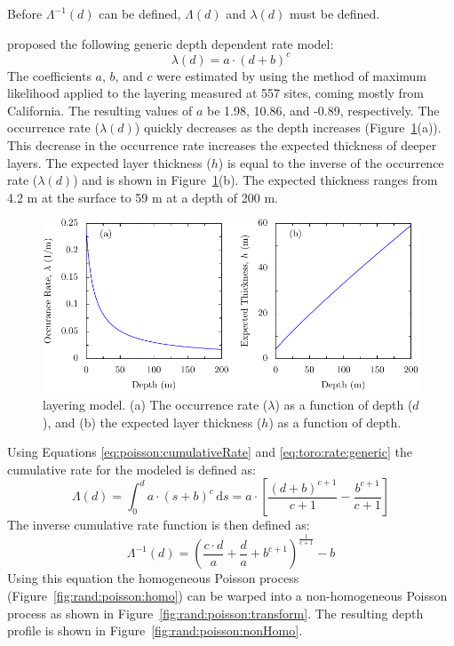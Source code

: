 \documentclass[11pt]{report}
\newcommand{\ud}{\,\mathrm{d}}
\begin{document}
Before $\Lambda^{-1}(d)$ can be
defined, $\Lambda(d)$ and $\lambda(d)$ must be defined.

\citet{toro:95} proposed the following generic depth dependent rate model:
\begin{equation}
  \lambda(d)= a \cdot (d + b)^{c}
  \label{eq:toro:rate:generic}
\end{equation}
The coefficients $a$, $b$, and $c$ were estimated by \citet{toro:95} using the method of maximum
likelihood applied to the layering measured at 557 sites, coming mostly from California.  The
resulting values of $a$ be 1.98, 10.86, and -0.89, respectively.  The occurrence rate ($\lambda(d)$) quickly
decreases as the depth increases (Figure~\ref{fig:rand:toro}(a)).  This decrease in the
occurrence rate increases the expected thickness of deeper layers.  The expected layer thickness
($h$) is equal to the inverse of the occurrence rate ($\lambda(d)$) and is shown in
Figure~\ref{fig:rand:toro}(b).  The expected thickness ranges from 4.2 m at the surface to
59 m at a depth of 200 m.

\begin{figure}[htb]
  \begin{center}
	\includegraphics[width=\linewidth]{figures/rand/toro.pdf}
  \end{center}
  \caption{\citet{toro:95} layering model. (a) The occurrence rate ($\lambda$) as a function of depth
  ($d$), and (b) the expected layer thickness ($h$) as a function of depth.}
  \label{fig:rand:toro}
\end{figure}

Using Equations \ref{eq:poisson:cumulativeRate} and \ref{eq:toro:rate:generic} the cumulative rate
for the \citet{toro:95} modeled is defined as:
\begin{equation}
	\Lambda(d) = \int_{0}^{d} a \cdot (s + b)^{c} \ud s = a \cdot \left[\frac{(d+b)^{c+1}}{c+1} -\frac{b^{c+1}}{c+1} \right]
  \label{eq:toro:cumRate}
\end{equation}
The inverse cumulative rate function is then defined as:
\begin{equation}
  \Lambda^{-1}(d)=\left( \frac{c \cdot d}{a} + \frac{d}{a} + b^{c+1} \right)^\frac{1}{c+1} - b 
  \label{eq:toro:invCumRate}
\end{equation}
Using this equation the homogeneous Poisson process (Figure~\ref{fig:rand:poisson:homo}) can
be warped into a non-homogeneous Poisson process as shown in Figure~\ref{fig:rand:poisson:transform}.
The resulting depth profile is shown in Figure~\ref{fig:rand:poisson:nonHomo}.
\end{document}
